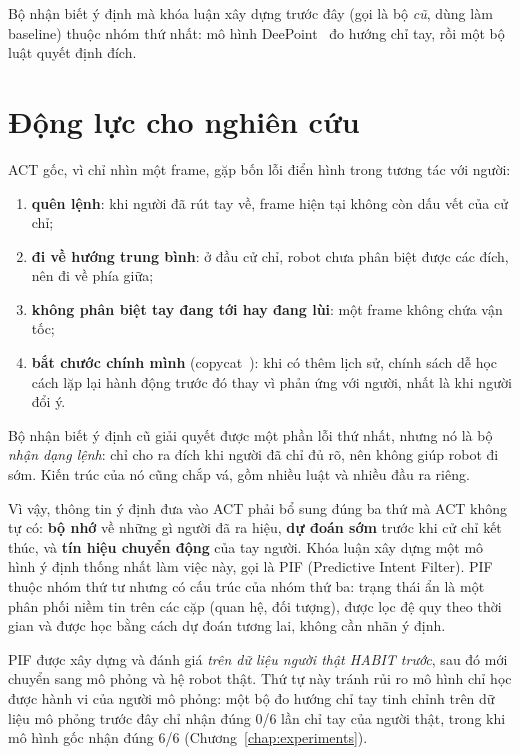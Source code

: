 Bộ nhận biết ý định mà khóa luận xây dựng trước đây (gọi là bộ \emph{cũ}, dùng làm baseline) thuộc nhóm thứ nhất: mô hình DeePoint~\cite{nakamura2023deepoint} đo hướng chỉ tay, rồi một bộ luật quyết định đích.

\section{Động lực cho nghiên cứu}
\label{sec:intro-motivation}

ACT gốc, vì chỉ nhìn một frame, gặp bốn lỗi điển hình trong tương tác với người:
\begin{enumerate}
  \item \textbf{quên lệnh}: khi người đã rút tay về, frame hiện tại không còn dấu vết của cử chỉ;
  \item \textbf{đi về hướng trung bình}: ở đầu cử chỉ, robot chưa phân biệt được các đích, nên đi về phía giữa;
  \item \textbf{không phân biệt tay đang tới hay đang lùi}: một frame không chứa vận tốc;
  \item \textbf{bắt chước chính mình} (copycat~\cite{wen2020copycat}): khi có thêm lịch sử, chính sách dễ học cách lặp lại hành động trước đó thay vì phản ứng với người, nhất là khi người đổi ý.
\end{enumerate}
Bộ nhận biết ý định cũ giải quyết được một phần lỗi thứ nhất, nhưng nó là bộ \emph{nhận dạng lệnh}: chỉ cho ra đích khi người đã chỉ đủ rõ, nên không giúp robot đi sớm. Kiến trúc của nó cũng chắp vá, gồm nhiều luật và nhiều đầu ra riêng.

Vì vậy, thông tin ý định đưa vào ACT phải bổ sung đúng ba thứ mà ACT không tự có: \textbf{bộ nhớ} về những gì người đã ra hiệu, \textbf{dự đoán sớm} trước khi cử chỉ kết thúc, và \textbf{tín hiệu chuyển động} của tay người. Khóa luận xây dựng một mô hình ý định thống nhất làm việc này, gọi là PIF (Predictive Intent Filter). PIF thuộc nhóm thứ tư nhưng có cấu trúc của nhóm thứ ba: trạng thái ẩn là một phân phối niềm tin trên các cặp (quan hệ, đối tượng), được lọc đệ quy theo thời gian và được học bằng cách dự đoán tương lai, không cần nhãn ý định.

PIF được xây dựng và đánh giá \emph{trên dữ liệu người thật HABIT trước}, sau đó mới chuyển sang mô phỏng và hệ robot thật. Thứ tự này tránh rủi ro mô hình chỉ học được hành vi của người mô phỏng: một bộ đo hướng chỉ tay tinh chỉnh trên dữ liệu mô phỏng trước đây chỉ nhận đúng 0/6 lần chỉ tay của người thật, trong khi mô hình gốc nhận đúng 6/6 (Chương~\ref{chap:experiments}).

